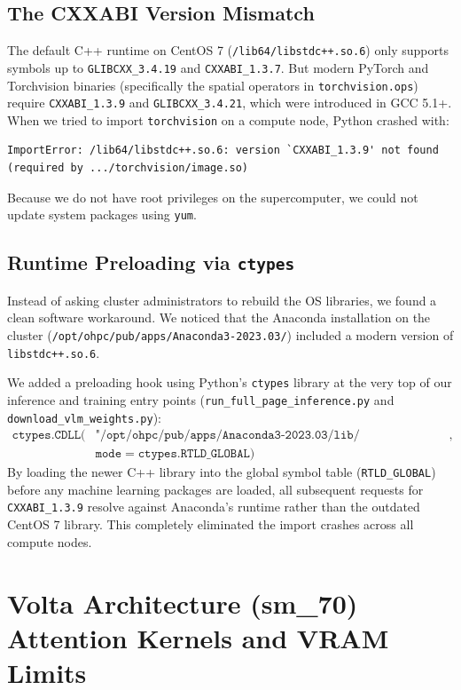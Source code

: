 \subsection{The CXXABI Version Mismatch}
The default C++ runtime on CentOS 7 (\texttt{/lib64/libstdc++.so.6}) only supports symbols up to \texttt{GLIBCXX\_3.4.19} and \texttt{CXXABI\_1.3.7}. But modern PyTorch and Torchvision binaries (specifically the spatial operators in \texttt{torchvision.ops}) require \texttt{CXXABI\_1.3.9} and \texttt{GLIBCXX\_3.4.21}, which were introduced in GCC 5.1+. When we tried to import \texttt{torchvision} on a compute node, Python crashed with:
\begin{verbatim}
ImportError: /lib64/libstdc++.so.6: version `CXXABI_1.3.9' not found 
(required by .../torchvision/image.so)
\end{verbatim}
Because we do not have root privileges on the supercomputer, we could not update system packages using \texttt{yum}.

\subsection{Runtime Preloading via \texttt{ctypes}}
Instead of asking cluster administrators to rebuild the OS libraries, we found a clean software workaround. We noticed that the Anaconda installation on the cluster (\texttt{/opt/ohpc/pub/apps/Anaconda3-2023.03/}) included a modern version of \texttt{libstdc++.so.6}. 

We added a preloading hook using Python's \texttt{ctypes} library at the very top of our inference and training entry points (\texttt{run\_full\_page\_inference.py} and \texttt{download\_vlm\_weights.py}):
\begin{equation}
\label{eq:ctypes_preload}
\begin{aligned}
\texttt{ctypes.CDLL}(&\texttt{"/opt/ohpc/pub/apps/Anaconda3-2023.03/lib/libstdc++.so.6"}, \\
&\texttt{mode} = \texttt{ctypes.RTLD\_GLOBAL})
\end{aligned}
\end{equation}
By loading the newer C++ library into the global symbol table (\texttt{RTLD\_GLOBAL}) before any machine learning packages are loaded, all subsequent requests for \texttt{CXXABI\_1.3.9} resolve against Anaconda's runtime rather than the outdated CentOS 7 library. This completely eliminated the import crashes across all compute nodes.

\section{Volta Architecture (sm\_70) Attention Kernels and VRAM Limits}
\label{sec:volta_vram_optimization}

